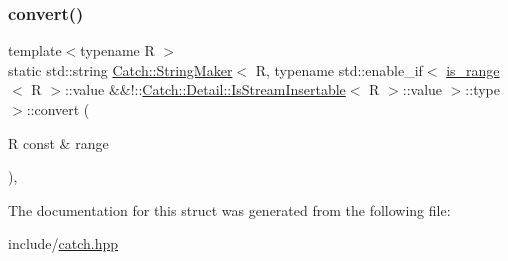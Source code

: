 \subsubsection{\texorpdfstring{convert()}{convert()}}
{\footnotesize\ttfamily template$<$typename R $>$ \\
static std\+::string \mbox{\hyperlink{struct_catch_1_1_string_maker}{Catch\+::\+String\+Maker}}$<$ R, typename std\+::enable\+\_\+if$<$ \mbox{\hyperlink{struct_catch_1_1is__range}{is\+\_\+range}}$<$ R $>$\+::value \&\&!\+::\mbox{\hyperlink{class_catch_1_1_detail_1_1_is_stream_insertable}{Catch\+::\+Detail\+::\+Is\+Stream\+Insertable}}$<$ R $>$\+::value $>$\+::type $>$\+::convert (\begin{DoxyParamCaption}\item[{R const \&}]{range }\end{DoxyParamCaption})\hspace{0.3cm}{\ttfamily [inline]}, {\ttfamily [static]}}



The documentation for this struct was generated from the following file\+:\begin{DoxyCompactItemize}
\item 
include/\mbox{\hyperlink{catch_8hpp}{catch.\+hpp}}\end{DoxyCompactItemize}
